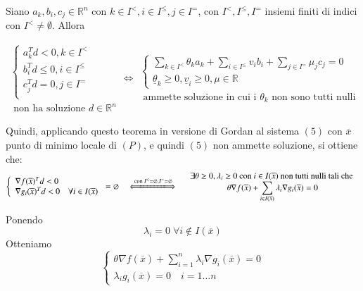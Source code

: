 \begin{theo}[Motzkin]

Siano $a_k, b_i, c_j \in \mathbb{R}^{n}$  con $k \in I^{<}, i \in I^{\leq},
j \in  I^{=}$, con $I^{<}, I^{\leq}, I^{=}$ insiemi
finiti di indici con $I^{<} \neq \emptyset$. Allora

$$
\begin{array}{l}
\left\{
\begin{array}{l}
a_k^{T}d < 0, k \in I^{<} \\
b_i^{T}d \leq 0, i \in I^{\leq} \\
c_j^{T}d = 0, j \in I^{=} \\
\end{array}
\right. \\
\text{ non ha soluzione } d \in \mathbb{R}^{n}
\end{array}
\Longleftrightarrow
\begin{array}{l}
\left\{
\begin{array}{l}
\displaystyle \sum_{k \in I^{<}} \theta_k a_k + \displaystyle \sum_{i \in I^{\leq}}
 v_i b_i + \displaystyle \sum_{j \in I^{=}} \mu_j c_j = 0 \\
\underline{\theta}_k \geq 0 , \underline{v}_{i} \geq 0 , \mu \in \mathbb{R}
\end{array}
\right.  \\
\text{ ammette soluzione in cui i } \theta_k \text{ non sono tutti nulli}
\end{array}
$$
\end{theo}

Quindi, applicando questo teorema in versione di Gordan al sistema $(5)$ con $\overline{x}$
punto di minimo locale di $(P)$, e quindi $(5)$ non ammette soluzione, si ottiene che:
$$
\left\{
\begin{array}{l}
\nabla f(\overline{x})^{T} d < 0 \\
 \nabla  g_i(\overline{x})^{T} d < 0 \quad \forall i \in I(\overline{x})
\end{array}
\right.
= \emptyset
\quad
\xLongleftrightarrow{\text{ con } I^{\leq} = \emptyset, I^{=} = \emptyset}
\quad
\begin{array}{c}
\exists \theta \geq 0, \lambda_i \geq 0 \text{ con } i \in I(\overline{x})
\text{ non tutti nulli tali che } \\
\theta \nabla f(\overline{x}) +
\displaystyle \sum_{i \in I(\overline{x})} \lambda_i \nabla g_i(\overline{x})
 = 0
\end{array}
$$

Ponendo
$$\lambda_i = 0 \; \forall i \notin I(\overline{x}) $$
Otteniamo
$$
\left\{
\begin{array}{l}
\theta \nabla f(\overline{x}) + \displaystyle \sum_{i=1}^{n}
\lambda_i \nabla g_i(\overline{x}) = 0  \\
\lambda_i g_i(\overline{x}) = 0 \quad i = 1 \ldots n
\end{array}
\right.
$$

